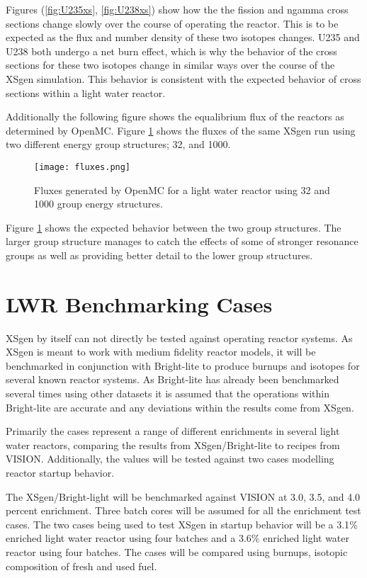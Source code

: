 \documentclass{article}
\begin{document}
Figures (\ref{fig:U235xs}, \ref{fig:U238xs}) show how the the fission and ngamma cross sections change slowly over the course of operating the reactor. This is to be expected as the flux and number density of these two isotopes changes. U235 and U238 both undergo a net burn effect, which is why the behavior of the cross sections for these two isotopes change in similar ways over the course of the XSgen simulation. This behavior is consistent with the expected behavior of cross sections within a light water reactor.

Additionally the following figure shows the equalibrium flux of the reactors as determined by OpenMC.
Figure \ref{fig:32g} shows the fluxes of the same XSgen run using two different energy group structures; 32, and 1000.

\begin{figure}[h]
  \center
  \texttt{[image: fluxes.png]}
  \caption{Fluxes generated by OpenMC for a light water reactor using 32 and 1000 group energy structures.}
  \label{fig:32g}
\end{figure}

Figure \ref{fig:32g} shows the expected behavior between the two group structures. The larger group structure manages to catch the effects of some of stronger resonance groups as well as providing better detail to the lower group structures.

\section{LWR Benchmarking Cases}
XSgen by itself can not directly be tested against operating reactor systems. As XSgen is meant to work with medium fidelity reactor models, it will be benchmarked in conjunction with Bright-lite to produce burnups and isotopes for several known reactor systems.  As Bright-lite has already been benchmarked several times using other datasets\cite{brightlite} it is assumed that the operations within Bright-lite are accurate and any deviations within the results come from XSgen.

Primarily the cases represent a range of different enrichments in several light water reactors, comparing the results from XSgen/Bright-lite to recipes from VISION\cite{vision}. Additionally, the values will be tested against two cases modelling reactor startup behavior.

The XSgen/Bright-light will be benchmarked against VISION at 3.0, 3.5, and 4.0 percent enrichment. Three batch cores will be assumed for all the enrichment test cases.
The two cases being used to test XSgen in startup behavior will be a 3.1$\%$ enriched light water reactor using four batches and a 3.6$\%$ enriched light water reactor using four batches. The cases will be compared using burnups, isotopic composition of fresh and used fuel.
\end{document}
